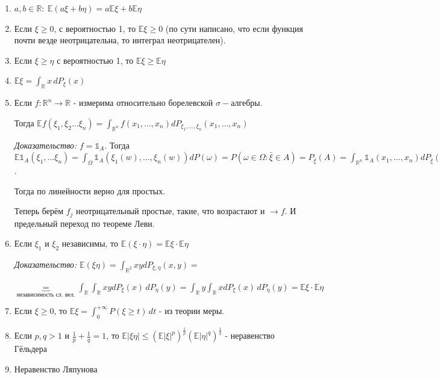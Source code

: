 \begin{properties}
    \begin{enumerate}
        \item {
            $a, b \in \mathbb{R}: \ \mathbb{E} (a\xi + b \eta) = a\mathbb{E} \xi + b \mathbb{E} \eta$
        }
        \item {
            Если $\xi \geqslant 0$, с вероятностью 1, то $\mathbb{E} \xi \geqslant 0$ (по сути написано, что если функция почти везде неотрицательна, то интеграл неотрицателен).
        }
        \item {
            Если $\xi \geqslant \eta$ с вероятностью 1, то $\mathbb{E}\xi \geqslant \mathbb{E} \eta$
        }
        \item {
            $\mathbb{E} \xi = \int_{\mathbb{R}} x \, dP_{\xi} (x)$
        }
        \item {
            Если $f : \mathbb{R}^n \to \mathbb{R}$ - измерима относительно борелевской $\sigma-$алгебры.

            Тогда $\mathbb{E} f(\xi_1, \xi_2 \ldots \xi_n) = \int_{\mathbb{R}^n} f(x_1, \ldots, x_n) dP_{\xi_1, \ldots, \xi_n} (x_1, \ldots, x_n)$

            \textit{Доказательство:} $f = \mathds{1}_A$. Тогда $\mathbb{E} \mathds{1}_A (\xi_1, \ldots \xi_n) =
            \int_{\Omega} \mathds{1}_A (\xi_1 (w), \ldots, \xi_n (w)) dP(\omega) =
            P(\omega \in \Omega : \bar{\xi} \in A) = P_{\bar{\xi}} (A) = \int_{\mathbb{R}^n} \mathds{1}_A (x_1, \ldots, x_n) dP_{\bar{\xi}} (x_1, \ldots, x_n)$.

            Тогда по линейности верно для простых.

            Теперь берём $f_j$ неотрицательный простые, такие, что возрастают и $\rightarrow f$. И предельный
            переход по теореме Леви.
        }
        \item {
            Если $\xi_1$ и $\xi_2$ независимы, то $\mathbb{E} (\xi \cdot \eta) = \mathbb{E} \xi \cdot \mathbb{E} \eta$

            \textit{Доказательство: } $\mathbb{E} (\xi \eta) = \int_{\mathbb{R}^2} xy dP_{\xi, \eta} (x, y) = $

            $\underbrace{=}_{\text{независимость сл. вел.}} \int_{\mathbb{R}} \int_{\mathbb{R}} xy dP_{\xi} (x) \, dP_{\eta} (y) =
            \int_{\mathbb{R}} y \int_{\mathbb{R}} x dP_{\xi} (x) \, dP_{\eta} (y) = \mathbb{E} \xi \cdot \mathbb{E} \eta$
        }
        \item {
            Если $\xi \geqslant 0$, то $\mathbb{E} \xi = \int_{0}^{+\infty} P(\xi \geqslant t) \, dt$ - из теории меры.
        }
        \item {
            Если $p, q > 1$ и $\frac{1}{p} + \frac{1}{q} = 1$, то $\mathbb{E}|\xi \eta| \leqslant (\mathbb{E}|\xi|^p)^{\frac{1}{p}} (\mathbb{E} |\eta|^q)^{\frac{1}{q}}$ -
            неравенство Гёльдера
        }
        \item {
            Неравенство Ляпунова

}
\end{enumerate}
\end{properties}
